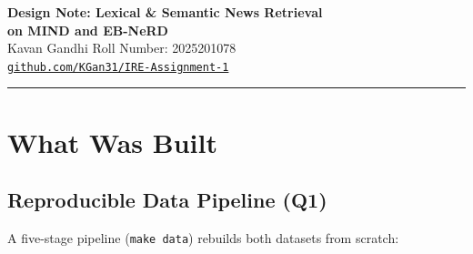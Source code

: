 \documentclass[11pt,a4paper]{article}
\begin{document}
\begin{center}
  {\Large\bfseries Design Note: Lexical \& Semantic News Retrieval\\[2pt]
  on MIND and EB-NeRD}\\[6pt]
  {\normalsize Kavan Gandhi \quad Roll Number: 2025201078}\\[2pt]
   {\normalsize \href{https://github.com/KGan31/IRE-Assignment-1}{\texttt{github.com/KGan31/IRE-Assignment-1}}}\\[2pt]
\end{center}
\vspace{4pt}\hrule\vspace{6pt}

\section{What Was Built}

\subsection{Reproducible Data Pipeline (Q1)}

A five-stage pipeline (\texttt{make data}) rebuilds both datasets from scratch:
\end{document}
